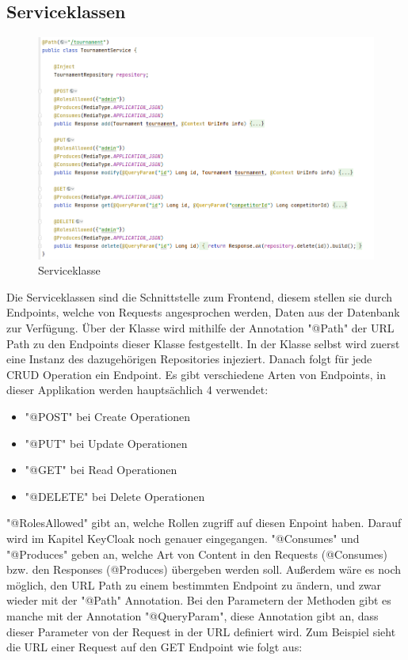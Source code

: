 \subsection{Serviceklassen}

\begin{figure}[H]
    \includegraphics[scale=0.6]{pics/service_class.png}
    \caption{Serviceklasse}
\end{figure}

Die Serviceklassen sind die Schnittstelle zum Frontend, diesem stellen sie durch Endpoints, welche von Requests angesprochen werden, Daten aus der Datenbank zur Verfügung. 
Über der Klasse wird mithilfe der Annotation "@Path" der URL Path zu den Endpoints dieser Klasse festgestellt. In der Klasse selbst wird zuerst eine Instanz des dazugehörigen Repositories injeziert. 
Danach folgt für jede CRUD Operation ein Endpoint. Es gibt verschiedene Arten von Endpoints, in dieser Applikation werden hauptsächlich 4 verwendet:

\begin{itemize}
    \item "@POST" bei Create Operationen
    \item "@PUT" bei Update Operationen
    \item "@GET" bei Read Operationen
    \item "@DELETE" bei Delete Operationen
\end{itemize}

"@RolesAllowed" gibt an, welche Rollen zugriff auf diesen Enpoint haben. Darauf wird im Kapitel KeyCloak noch genauer eingegangen. "@Consumes" und "@Produces" geben an, 
welche Art von Content in den Requests (@Consumes) bzw. den Responses (@Produces) übergeben werden soll. Außerdem wäre es noch möglich, den URL Path zu einem bestimmten Endpoint zu ändern, 
und zwar wieder mit der "@Path" Annotation. Bei den Parametern der Methoden gibt es manche mit der Annotation "@QueryParam", diese Annotation gibt an, dass dieser Parameter von der 
Request in der URL definiert wird. Zum Beispiel sieht die URL einer Request auf den GET Endpoint wie folgt aus:

